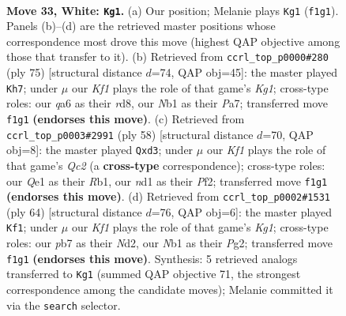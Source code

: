 \documentclass[11pt]{article}
\begin{document}
\clearpage

\begin{figure}[p]\centering
\begin{subfigure}{0.46\textwidth}\centering
\resizebox{\linewidth}{!}{%
\newchessgame
\chessboard[
  setfen={r5k1/1p3pb1/q5p1/p2pB3/3n3p/7P/P4PP1/RN1nQK2 w - - 2 33},
  showmover=false,
  pgfstyle=straightmove, color=movearrow, markmove={f1-g1}
]}
\caption{}
\end{subfigure}\hfill
\begin{subfigure}{0.46\textwidth}\centering
\resizebox{\linewidth}{!}{%
\newchessgame
\chessboard[
  setfen={3R2k1/p1r1bpp1/4p2p/8/2N1q2P/1P4P1/P4P2/3Q2K1 b - - 5 38},
  showmover=false,
  pgfstyle=straightmove, color=movearrow, markmove={g8-h7}
]}
\caption{}
\end{subfigure}
\\[4pt]
\begin{subfigure}{0.46\textwidth}\centering
\resizebox{\linewidth}{!}{%
\newchessgame
\chessboard[
  setfen={4r1k1/2pq1pp1/p2p3p/3n4/8/P2pP1PP/2Q2PB1/1R4K1 w - - 0 30},
  showmover=false,
  pgfstyle=straightmove, color=movearrow, markmove={c2-d3}
]}
\caption{}
\end{subfigure}\hfill
\begin{subfigure}{0.46\textwidth}\centering
\resizebox{\linewidth}{!}{%
\newchessgame
\chessboard[
  setfen={6k1/1pb1qpp1/2r5/1Q6/P3p2p/3nP2P/3N1PP1/B2R2K1 w - - 0 33},
  showmover=false,
  pgfstyle=straightmove, color=movearrow, markmove={g1-f1}
]}
\caption{}
\end{subfigure}
\caption{\textbf{Move 33, White: \texttt{Kg1}.} (a) Our position; Melanie plays \texttt{Kg1} (\texttt{f1g1}). Panels (b)--(d) are the retrieved master positions whose correspondence most drove this move (highest QAP objective among those that transfer to it). (b) Retrieved from \texttt{ccrl\_top\_p0000\#280} (ply 75) [structural distance $d$=74, QAP obj=45]: the master played \texttt{Kh7}; under $\mu$ our \emph{Kf1} plays the role of that game's \emph{Kg1}; cross-type roles: our \emph{q}a6 as their \emph{r}d8, our \emph{N}b1 as their \emph{P}a7; transferred move \texttt{f1g1} \textbf{(endorses this move)}. (c) Retrieved from \texttt{ccrl\_top\_p0003\#2991} (ply 58) [structural distance $d$=70, QAP obj=8]: the master played \texttt{Qxd3}; under $\mu$ our \emph{Kf1} plays the role of that game's \emph{Qc2} (a \textbf{cross-type} correspondence); cross-type roles: our \emph{Q}e1 as their \emph{R}b1, our \emph{n}d1 as their \emph{P}f2; transferred move \texttt{f1g1} \textbf{(endorses this move)}. (d) Retrieved from \texttt{ccrl\_top\_p0002\#1531} (ply 64) [structural distance $d$=76, QAP obj=6]: the master played \texttt{Kf1}; under $\mu$ our \emph{Kf1} plays the role of that game's \emph{Kg1}; cross-type roles: our \emph{p}b7 as their \emph{N}d2, our \emph{N}b1 as their \emph{P}g2; transferred move \texttt{f1g1} \textbf{(endorses this move)}. Synthesis: 5 retrieved analogs transferred to \texttt{Kg1} (summed QAP objective 71, the strongest correspondence among the candidate moves); Melanie committed it via the \texttt{search} selector.}
\label{fig:thought-m64}
\end{figure}
\end{document}
